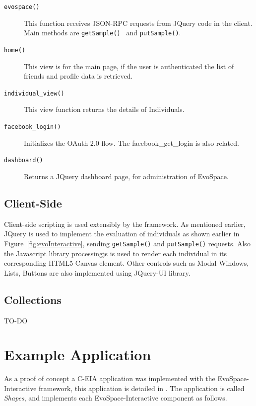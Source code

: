 \documentclass{sig-alternate}
\begin{document}
\begin{description}

\item[\texttt{evospace()}] This function receives JSON-RPC requests from JQuery code in the client. Main methods are \texttt{getSample() } and \texttt{putSample()}. 
\item[\texttt{home()}] This view is for the main page, if the user is authenticated the list of friends and profile data is retrieved.
\item [\texttt{individual\_view()}] This view function returns the details of Individuals.
\item [\texttt{facebook\_login()}] Initializes the OAuth 2.0 flow. The facebook\_get\_login is also related.
\item [\texttt{dashboard()}] Returns a JQuery dashboard page, for administration of EvoSpace.
\end{description}

\subsection{Client-Side}
Client-side scripting is used extensibly by the framework. As mentioned earlier, JQuery is used to implement the evaluation of individuals as shown earlier in Figure~\ref{fig:evoInteractive}, sending \texttt{getSample()} and \texttt{putSample()} requests.  Also the Javascript library processingjs is used to render each individual in its corresponding HTML5 Canvas element. Other controls such as Modal Windows, Lists, Buttons are also implemented using JQuery-UI library.
    
\subsection{Collections}
TO-DO
\section{Example Application}
As a proof of concept a C-EIA application was implemented with the EvoSpace-Interactive framework, this application is detailed in \cite{Musart}. The application is called \emph{Shapes}, and implements each EvoSpace-Interactive component as follows.
\end{document}

